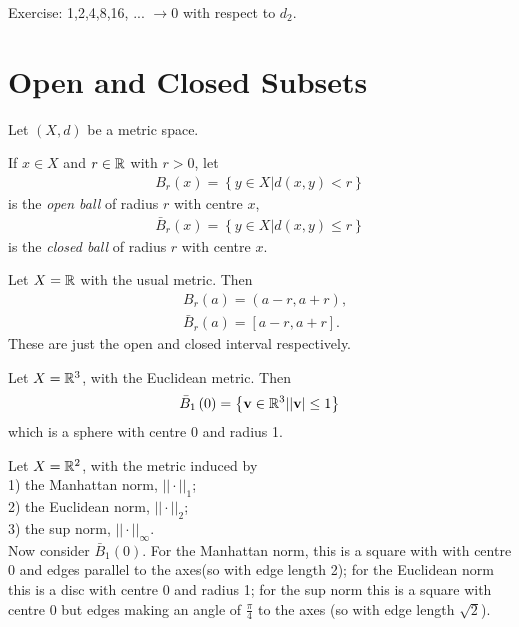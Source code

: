 \documentclass[a4paper]{article}
\begin{document}
Exercise: 1,2,4,8,16, ... $\to 0$ with respect to $d_2$.

\newpage
\section{Open and Closed Subsets}
Let $\left(X,d\right)$ be a metric space.

\begin{defi}
If $x\in X$ and $r\in \mathbb{R}$ with $r>0$, let
\begin{equation*}
\begin{aligned}
B_r\left(x\right) = \left\{ y\in X | d\left(x,y\right) < r \right\}
\end{aligned}
\end{equation*}
is the \emph{open ball} of radius $r$ with centre $x$,
\begin{equation*}
\begin{aligned}
\bar{B}_r \left(x\right) = \left\{y \in X | d\left(x,y\right) \leq r \right\}
\end{aligned}
\end{equation*}
is the \emph{closed ball} of radius $r$ with centre $x$.
\end{defi}

\begin{eg}
Let $X=\mathbb{R}$ with the usual metric. Then
\begin{equation*}
\begin{aligned}
&B_r\left(a\right) = \left(a-r,a+r\right),\\
&\bar{B}_r\left(a\right) = \left[a-r,a+r\right].
\end{aligned}
\end{equation*}
These are just the open and closed interval respectively.
\end{eg}

\begin{eg}
Let $X=\mathbb{R}^3$, with the Euclidean metric. Then
\begin{equation*}
\begin{aligned}
\bar{B}_1\left(0\right) = \left\{ \mathbf{v}\in \mathbb{R}^3 | |\mathbf{v}| \leq 1\right\}
\end{aligned}
\end{equation*}
which is a sphere with centre 0 and radius 1.
\end{eg}

\begin{eg}
Let $X=\mathbb{R}^2$, with the metric induced by\\ 1) the Manhattan norm, $||\cdot ||_1$;\\
2) the Euclidean norm, $||\cdot ||_2$;\\
3) the sup norm, $||\cdot ||_\infty$.\\
Now consider $\bar{B}_1\left(0\right)$. For the Manhattan norm, this is a square with with centre 0 and edges parallel to the axes(so with edge length 2); for the Euclidean norm this is a disc with centre 0 and radius 1; for the sup norm this is a square with centre 0 but edges making an angle of $\frac{\pi}{4}$ to the axes (so with edge length $\sqrt{2}$).
\end{eg}
\end{document}
